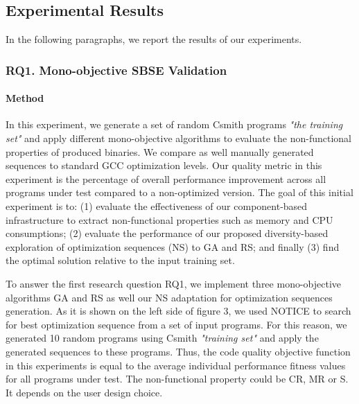 \subsection{Experimental Results}
In the following paragraphs, we report the results of our experiments.

\subsubsection{RQ1. Mono-objective SBSE Validation}
\paragraph{Method}
In this experiment, we generate a set of random Csmith programs \textit{"the training set"} and apply different mono-objective algorithms to evaluate the non-functional properties of produced binaries. We compare as well manually generated sequences to standard GCC optimization levels. Our quality metric in this experiment is the percentage of overall performance improvement across all programs under test compared to a non-optimized version. The goal of this initial experiment is to: (1) evaluate the effectiveness of our component-based infrastructure to extract non-functional properties such as memory and CPU consumptions; (2) evaluate the performance of our proposed diversity-based exploration of optimization sequences (NS) to GA and RS; and finally (3) find the optimal solution relative to the input training set.




To answer the first research question RQ1, we implement three mono-objective algorithms GA and RS as well our NS adaptation for optimization sequences generation. As it is shown on the left side of figure 3, we used NOTICE to search for best optimization sequence from a set of input programs. For this reason, we generated 10 random programs using Csmith \textit{"training set"} and apply the generated sequences to these programs. Thus, the code quality objective function in this
experiments is equal to the average individual performance fitness values for all programs under test. The non-functional property could be CR, MR or S. It depends on the user design choice.
